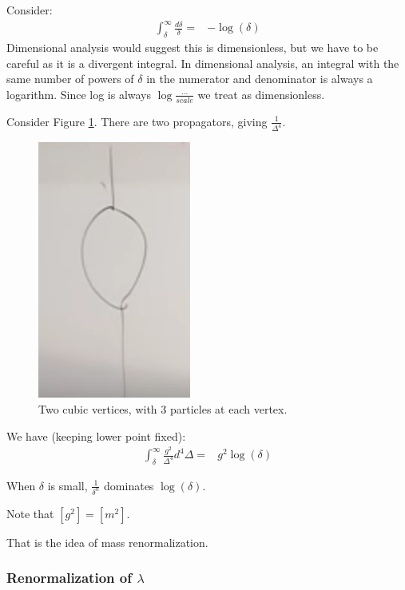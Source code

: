 \documentclass[]{article}
\begin{document}
Consider:
\begin{align*}
	\int_{\delta}^{\infty} \frac{d \delta}{\delta} =& - \log(\delta)
\end{align*}
Dimensional analysis would suggest this is dimensionless, but we have to be careful as it is a divergent integral. In dimensional analysis, an integral with  the same number of powers of $\delta$ in the numerator and denominator is always a logarithm. Since log is always $\log\frac{...}{scale}$ we treat as dimensionless.

Consider Figure \ref{fig:particles3-1-two-cubic-vertices}. There are two propagators, giving $\frac{1}{\Delta^4}$.
\begin{figure}[H]
	\begin{center}
		\caption{Two cubic vertices, with 3 particles at each vertex.}\label{fig:particles3-1-two-cubic-vertices}
		\includegraphics{particles3-1-two-cubic-vertices}
	\end{center}
\end{figure}

We have (keeping lower point fixed):
\begin{align*}
	\int_{\delta}^{\infty} \frac{g^2}{\Delta^4} d^4 \Delta =& g^2 \log(\delta)
\end{align*}

When $\delta$ is small, $\frac{1}{\delta^n}$ dominates $\log(\delta)$.

Note that $[g^2] = [m^2]$.

That is the idea of mass renormalization.

\subsubsection{Renormalization of $\lambda$}\label{sect:renormalization:lambda}
\end{document}
